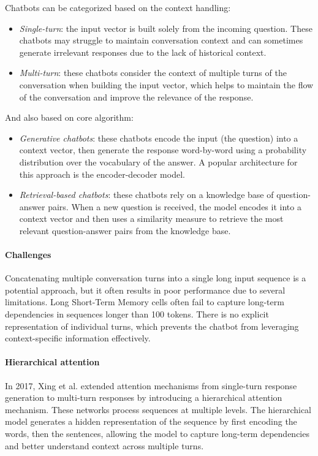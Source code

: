 Chatbots can be categorized based on the context handling: 
\begin{itemize}
    \item \textit{Single-turn}: the input vector is built solely from the incoming question. 
        These chatbots may struggle to maintain conversation context and can sometimes generate irrelevant responses due to the lack of historical context.
    \item \textit{Multi-turn}: these chatbots consider the context of multiple turns of the conversation when building the input vector, which helps to maintain the flow of the conversation and improve the relevance of the response.
\end{itemize}
\noindent And also based on core algorithm: 
\begin{itemize}
    \item \textit{Generative chatbots}: these chatbots encode the input (the question) into a context vector, then generate the response word-by-word using a probability distribution over the vocabulary of the answer. 
        A popular architecture for this approach is the encoder-decoder model.
    \item \textit{Retrieval-based chatbots}: these chatbots rely on a knowledge base of question-answer pairs. 
        When a new question is received, the model encodes it into a context vector and then uses a similarity measure to retrieve the most relevant question-answer pairs from the knowledge base.
\end{itemize}

\paragraph*{Challenges}
Concatenating multiple conversation turns into a single long input sequence is a potential approach, but it often results in poor performance due to several limitations. 
Long Short-Term Memory cells often fail to capture long-term dependencies in sequences longer than 100 tokens.
There is no explicit representation of individual turns, which prevents the chatbot from leveraging context-specific information effectively.

\paragraph*{Hierarchical attention}
In 2017, Xing et al. extended attention mechanisms from single-turn response generation to multi-turn responses by introducing a hierarchical attention mechanism. 
These networks process sequences at multiple levels.
The hierarchical model generates a hidden representation of the sequence by first encoding the words, then the sentences, allowing the model to capture long-term dependencies and better understand context across multiple turns.
